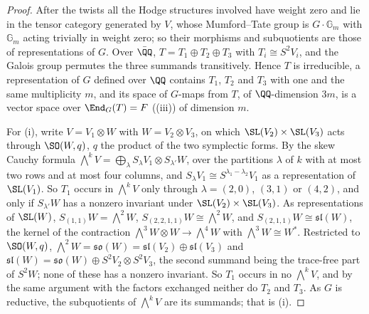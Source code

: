 \begin{proof}
After the twists all the Hodge structures involved have weight zero and lie in
the tensor category generated by $V$, whose Mumford--Tate group is
$G\cdot\mathbb{G}_{m}$ with $\mathbb{G}_{m}$ acting trivially in weight zero;
so their morphisms and subquotients are those of representations of $G$.
Over $\bar{\QQ}$, $T=T_{1}\oplus T_{2}\oplus T_{3}$ with $T_{i}\cong S^{2}V_{i}$,
and the Galois group permutes the three summands transitively. Hence $T$ is
irreducible, a representation of $G$ defined over $\QQ$ contains
$T_{1}$, $T_{2}$ and $T_{3}$ with one and the same multiplicity $m$, and its
space of $G$-maps from $T$, of $\QQ$-dimension $3m$, is a vector space over
$\End_{G}(T)=F$ ((iii)) of dimension $m$.

For (i), write $V=V_{1}\otimes W$ with $W=V_{2}\otimes V_{3}$, on which
$\SL(V_{2})\times\SL(V_{3})$ acts through $\SO(W,q)$, $q$ the product of the
two symplectic forms. By the skew Cauchy formula
$\bigwedge^{k}V=\bigoplus_{\lambda}S_{\lambda}V_{1}\otimes S_{\lambda'}W$,
over the partitions $\lambda$ of $k$ with at most two rows and at most four
columns, and $S_{\lambda}V_{1}\cong S^{\lambda_{1}-\lambda_{2}}V_{1}$ as a
representation of $\SL(V_{1})$. So $T_{1}$ occurs in $\bigwedge^{k}V$ only
through $\lambda=(2,0)$, $(3,1)$ or $(4,2)$, and only if $S_{\lambda'}W$ has a
nonzero invariant under $\SL(V_{2})\times\SL(V_{3})$. As representations of
$\SL(W)$, $S_{(1,1)}W=\bigwedge^{2}W$, $S_{(2,2,1,1)}W\cong\bigwedge^{2}W$, and
$S_{(2,1,1)}W\cong\mathfrak{sl}(W)$, the kernel of the contraction
$\bigwedge^{3}W\otimes W\to\bigwedge^{4}W$ with $\bigwedge^{3}W\cong W^{*}$.
Restricted to $\SO(W,q)$, $\bigwedge^{2}W=\mathfrak{so}(W)=
\mathfrak{sl}(V_{2})\oplus\mathfrak{sl}(V_{3})$ and
$\mathfrak{sl}(W)=\mathfrak{so}(W)\oplus S^{2}V_{2}\otimes S^{2}V_{3}$, the
second summand being the trace-free part of $S^{2}W$; none of these has a
nonzero invariant. So $T_{1}$ occurs in no $\bigwedge^{k}V$, and by the same
argument with the factors exchanged neither do $T_{2}$ and $T_{3}$. As $G$ is
reductive, the subquotients of $\bigwedge^{k}V$ are its summands; that is (i).


\end{proof}
